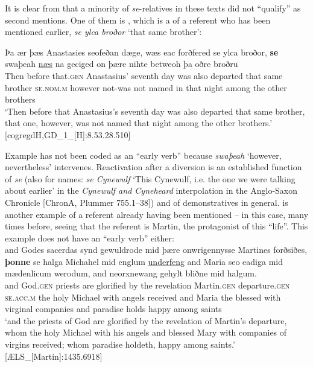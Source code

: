 \documentclass[output=paper,colorlinks,citecolor=brown]{langscibook}
\begin{document}
It is clear from  that a minority of \textit{se}{}-relatives in these texts did not “qualify” as second mentions. One of them is , which is a  of a referent who has been mentioned earlier, \textit{se ylca broðor} ‘that same brother':

 \ea\label{ex:los:24}
 \gll Þa ær þæs Anastasies seofeðan dæge, wæs eac forðfered se ylca broðor, \textbf{se} swaþeah \underline{næs} na geciged on þære nihte betweoh þa oðre broðru\\
Then before that.\textsc{gen} Anastasius' seventh day was also departed that same brother \textsc{se.nom.m} however not-was not named in that night among the other brothers\\ 
\glt ‘Then before that Anastasius's seventh day was also departed that same brother, that one, however, was not named that night among the other brothers.' \hfill [cogregdH,GD\_1\_[H]:8.53.28.510]
\z

Example  has not been coded as an “early verb” because \textit{swaþeah} ‘however, nevertheless' intervenes. Reactivation after a diversion is an established function of \textit{se} (also for names: \textit{se Cynewulf} ‘This Cynewulf, i.e. the one we were talking about earlier' in the \textit{Cynewulf and Cyneheard} interpolation in the Anglo-Saxon Chronicle [ChronA, Plummer 755.1--38]) and of demonstratives in general.  is another example of a referent already having been mentioned – in this case, many times before, seeing that the referent is Martin, the protagonist of this “life”. This example does not have an “early verb” either:\\

\ea\label{ex:los:25}
\gll and Godes sacerdas synd gewuldrode mid þære onwrigennysse Martines forðsiðes, \textbf{þonne} se halga Michahel mid englum \underline{underfeng} and Maria seo eadiga mid mædenlicum werodum, and neorxnewang gehylt bliðne mid halgum.\\
and God.\textsc{gen} priests are glorified by the revelation Martin.\textsc{gen} departure.\textsc{gen} \textsc{se.acc.m} the holy Michael with angels received and Maria the blessed with virginal companies and paradise holds happy among saints\\
\glt ‘and the priests of God are glorified by the revelation of Martin's departure, whom the holy Michael with his angels and blessed Mary with companies of virgins received; whom paradise holdeth, happy among saints.' \hfill [ÆLS\_[Martin]:1435.6918]
\z
\end{document}
